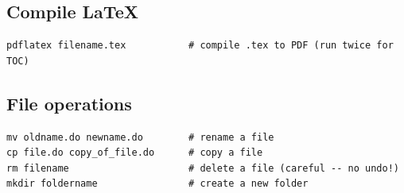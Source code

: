 \documentclass[11pt]{article}
\begin{document}
\subsection{Compile LaTeX}

\begin{lstlisting}[style=bash]
pdflatex filename.tex           # compile .tex to PDF (run twice for TOC)
\end{lstlisting}

\subsection{File operations}

\begin{lstlisting}[style=bash]
mv oldname.do newname.do        # rename a file
cp file.do copy_of_file.do      # copy a file
rm filename                     # delete a file (careful -- no undo!)
mkdir foldername                # create a new folder
\end{lstlisting}
\end{document}
